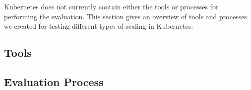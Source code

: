 Kubernetes does not currently contain either the tools or processes for
performing the evaluation. This section gives an overview of tools and processes
we created for testing different types of scaling in Kubernetes.

\subsection{Tools}



\subsection{Evaluation Process}


